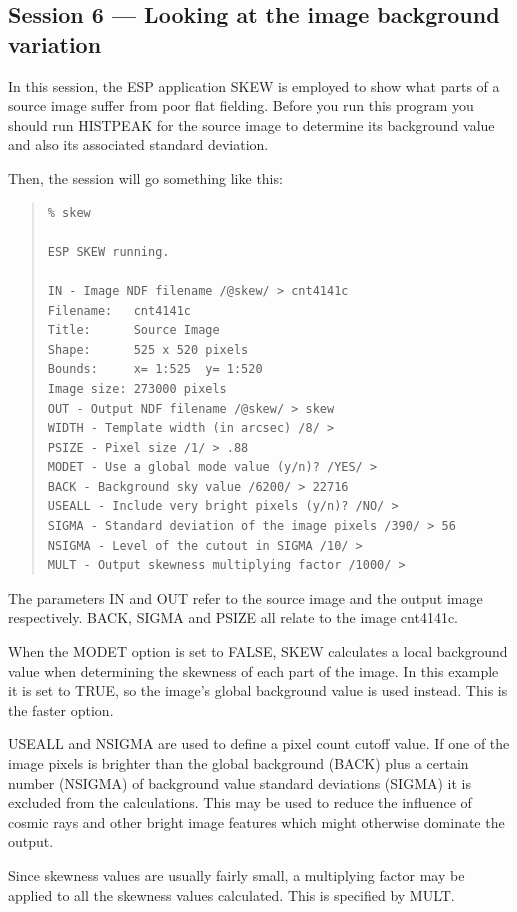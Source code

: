 \documentclass[twoside,11pt]{article}
\newcommand{\xlabel}[1]{}
\newenvironment{myquote}{\begin{quote}\begin{small}}{\end{small}\end{quote}}
\begin{document}
\subsection{Session 6 --- Looking at the image background variation}
\xlabel{SESSION6}
In this  session, the ESP application SKEW is employed to show
what parts of a source image suffer from poor flat fielding.
Before you run this program you should run HISTPEAK for the source image to
determine its background value and also its associated standard deviation.

Then, the session will go something like this:

\begin{myquote}
\begin{verbatim}
% skew

ESP SKEW running.

IN - Image NDF filename /@skew/ > cnt4141c
Filename:   cnt4141c
Title:      Source Image
Shape:      525 x 520 pixels
Bounds:     x= 1:525  y= 1:520
Image size: 273000 pixels
OUT - Output NDF filename /@skew/ > skew
WIDTH - Template width (in arcsec) /8/ >
PSIZE - Pixel size /1/ > .88
MODET - Use a global mode value (y/n)? /YES/ >
BACK - Background sky value /6200/ > 22716
USEALL - Include very bright pixels (y/n)? /NO/ >
SIGMA - Standard deviation of the image pixels /390/ > 56
NSIGMA - Level of the cutout in SIGMA /10/ >
MULT - Output skewness multiplying factor /1000/ >
\end{verbatim}
\end{myquote}

The parameters IN and OUT refer to the source image and the output image
respectively. BACK, SIGMA and PSIZE all relate to the image
cnt4141c.

When the MODET option is set to FALSE, SKEW calculates a local background
value when determining the skewness of each part of the image. In this
example it is set to TRUE, so the image's global background value is used
instead. This is the faster option.

USEALL and NSIGMA are used to define a pixel count cutoff value. If one of the
image pixels is brighter than the global background (BACK) plus a certain
number (NSIGMA) of background value standard deviations (SIGMA) it is excluded from the
calculations. This may be used to reduce the influence of cosmic rays and
other bright image features which might otherwise dominate the output.

Since skewness values are usually fairly small, a multiplying factor may be
applied to all the skewness values calculated. This is specified by MULT.
\end{document}
